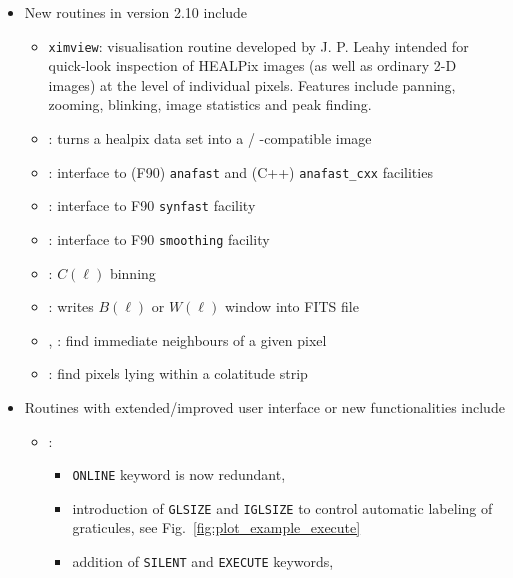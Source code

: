 \documentclass[12pt,twoside]{article}
\newcommand{\compresslist}{%
\setlength{\itemsep}{0ex}}{}
\begin{document}
{\begin{itemize}
%
\item New routines in version 2.10 include
\begin{itemize}\compresslist %
 \item {{\tt ximview}}: visualisation routine developed by J. P. Leahy intended for quick-look inspection of HEALPix images 
(as well as ordinary 2-D images) at the level of individual pixels. Features
include panning, zooming, blinking, image statistics and peak finding.
 \item {}: turns a healpix data set into a
%
/%
%
-compatible image
 \item {}: interface to (F90) {\tt anafast}
and (C++) {\tt anafast\_cxx} facilities 
 \item {}: interface to F90 {\tt synfast} facility
 \item {}: interface to F90 {\tt smoothing} facility
 \item {}: $C(\ell)$ binning
 \item {}: writes $B(\ell)$ or $W(\ell)$ window into
FITS file
 \item {}, %
       : %
   find immediate neighbours of a given pixel
 \item {}: %
   find pixels lying within a colatitude strip
\end{itemize} %
%
\item Routines with extended/improved user interface or new functionalities include
 \begin{itemize}\compresslist %
  \item {}: 
  \begin{itemize}\compresslist %
   \item {\tt ONLINE} keyword is now redundant, 
   \item introduction of {\tt GLSIZE} and {\tt IGLSIZE} to
  	control automatic labeling of graticules,
	see Fig.~\ref{fig:plot_example_execute}
   \item addition of {\tt SILENT} and {\tt EXECUTE} keywords,

\end{itemize}
\end{itemize}
\end{itemize}}
\end{document}
